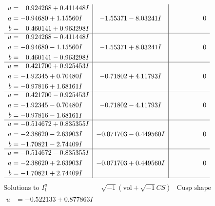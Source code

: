\documentclass[1p]{elsarticle_modified}
\theoremstyle{definition}
\newcommand{\I}{\sqrt{-1}}
\begin{document}
$$\begin{array}{c|c|c}
\begin{aligned}
u &= \phantom{-}0.924268 + 0.411448 I \\
a &= -0.94680 + 1.15560 I \\
b &= \phantom{-}0.460141 + 0.963298 I\end{aligned}
 & -1.55371 - 8.03241 I & \phantom{-0.000000 } 0 \\ \hline\begin{aligned}
u &= \phantom{-}0.924268 - 0.411448 I \\
a &= -0.94680 - 1.15560 I \\
b &= \phantom{-}0.460141 - 0.963298 I\end{aligned}
 & -1.55371 + 8.03241 I & \phantom{-0.000000 } 0 \\ \hline\begin{aligned}
u &= \phantom{-}0.421700 + 0.925453 I \\
a &= -1.92345 + 0.70480 I \\
b &= -0.97816 + 1.68161 I\end{aligned}
 & -0.71802 + 4.11793 I & \phantom{-0.000000 } 0 \\ \hline\begin{aligned}
u &= \phantom{-}0.421700 - 0.925453 I \\
a &= -1.92345 - 0.70480 I \\
b &= -0.97816 - 1.68161 I\end{aligned}
 & -0.71802 - 4.11793 I & \phantom{-0.000000 } 0 \\ \hline\begin{aligned}
u &= -0.514672 + 0.835355 I \\
a &= -2.38620 - 2.63903 I \\
b &= -1.70821 - 2.74409 I\end{aligned}
 & -0.071703 - 0.449560 I & \phantom{-0.000000 } 0 \\ \hline\begin{aligned}
u &= -0.514672 - 0.835355 I \\
a &= -2.38620 + 2.63903 I \\
b &= -1.70821 + 2.74409 I\end{aligned}
 & -0.071703 + 0.449560 I & \phantom{-0.000000 } 0\\
 \hline 
 \end{array}$$\newpage$$\begin{array}{c|c|c}  
\text{Solutions to }I^u_{1}& \I (\text{vol} + \sqrt{-1}CS) & \text{Cusp shape}\\
 \hline 
\begin{aligned}
u &= -0.522133 + 0.877863 I \\

\end{aligned}
\end{array}$$
\end{document}
